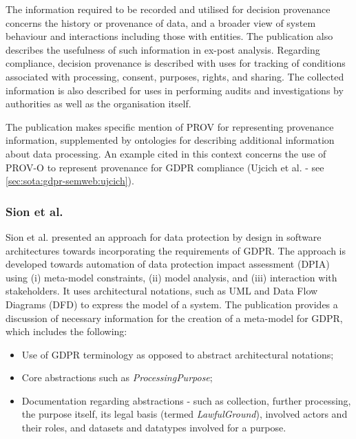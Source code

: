 The information required to be recorded and utilised for decision provenance concerns the history or provenance of data, and a broader view of system behaviour and interactions including those with entities. The publication also describes the usefulness of such information in ex-post analysis.
Regarding compliance, decision provenance is described with uses for tracking of conditions associated with processing, consent, purposes, rights, and sharing.
The collected information is also described for uses in performing audits and investigations by authorities as well as the organisation itself.

The publication makes specific mention of PROV \cite{lebo_prov-o_2013} for representing provenance information, supplemented by ontologies for describing additional information about data processing.
An example cited in this context concerns the use of PROV-O to represent provenance for GDPR compliance (Ujcich et al. \cite{belhajjame_provenance_2018} - see \autoref{sec:sota:gdpr-semweb:ujcich}).

\subsubsection{Sion et al.}
Sion et al. \cite{sion_architectural_2019} presented an approach for data protection by design in software architectures towards incorporating the requirements of GDPR. The approach is developed towards automation of data protection impact assessment (DPIA) using (i) meta-model constraints, (ii) model analysis, and  (iii) interaction with stakeholders. It uses architectural notations, such as UML and Data Flow Diagrams (DFD) to express the model of a system.  The publication provides a discussion of necessary information for the creation of a meta-model for GDPR, which includes the following:
\begin{itemize}
    \item Use of GDPR terminology as opposed to abstract architectural notations; 
    \item Core abstractions such as \textit{ProcessingPurpose};
    \item Documentation regarding abstractions - such as collection, further processing, the purpose itself, its legal basis (termed \textit{LawfulGround}), involved actors and their roles, and datasets and datatypes involved for a purpose.
\end{itemize}

